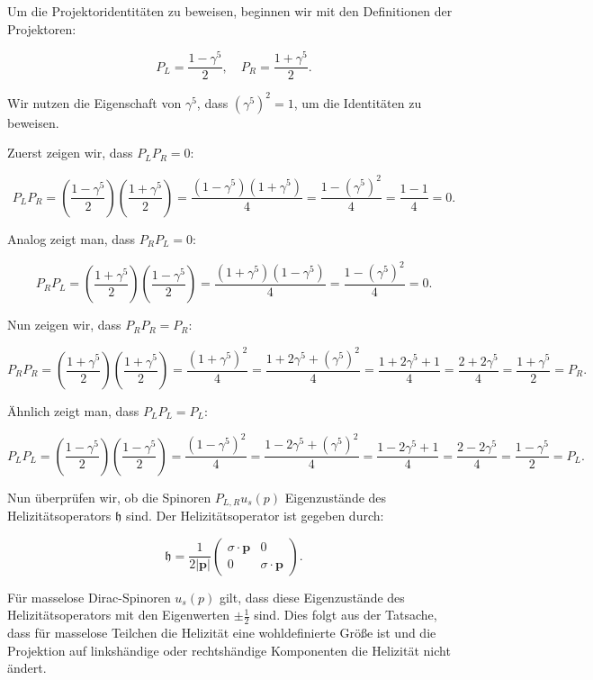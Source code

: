 Um die Projektoridentitäten zu beweisen, beginnen wir mit den Definitionen der Projektoren:

\[
P_L = \frac{1 - \gamma^5}{2}, \quad P_R = \frac{1 + \gamma^5}{2}.
\]

Wir nutzen die Eigenschaft von \(\gamma^5\), dass \((\gamma^5)^2 = 1\), um die Identitäten zu beweisen.

Zuerst zeigen wir, dass \(P_L P_R = 0\):

\[
P_L P_R = \left(\frac{1 - \gamma^5}{2}\right)\left(\frac{1 + \gamma^5}{2}\right) = \frac{(1 - \gamma^5)(1 + \gamma^5)}{4} = \frac{1 - (\gamma^5)^2}{4} = \frac{1 - 1}{4} = 0.
\]

Analog zeigt man, dass \(P_R P_L = 0\):

\[
P_R P_L = \left(\frac{1 + \gamma^5}{2}\right)\left(\frac{1 - \gamma^5}{2}\right) = \frac{(1 + \gamma^5)(1 - \gamma^5)}{4} = \frac{1 - (\gamma^5)^2}{4} = 0.
\]

Nun zeigen wir, dass \(P_R P_R = P_R\):

\[
P_R P_R = \left(\frac{1 + \gamma^5}{2}\right)\left(\frac{1 + \gamma^5}{2}\right) = \frac{(1 + \gamma^5)^2}{4} = \frac{1 + 2\gamma^5 + (\gamma^5)^2}{4} = \frac{1 + 2\gamma^5 + 1}{4} = \frac{2 + 2\gamma^5}{4} = \frac{1 + \gamma^5}{2} = P_R.
\]

Ähnlich zeigt man, dass \(P_L P_L = P_L\):

\[
P_L P_L = \left(\frac{1 - \gamma^5}{2}\right)\left(\frac{1 - \gamma^5}{2}\right) = \frac{(1 - \gamma^5)^2}{4} = \frac{1 - 2\gamma^5 + (\gamma^5)^2}{4} = \frac{1 - 2\gamma^5 + 1}{4} = \frac{2 - 2\gamma^5}{4} = \frac{1 - \gamma^5}{2} = P_L.
\]

Nun überprüfen wir, ob die Spinoren \(P_{L, R} u_s(p)\) Eigenzustände des Helizitätsoperators \(\mathfrak{h}\) sind. Der Helizitätsoperator ist gegeben durch:

\[
\mathfrak{h} = \frac{1}{2|\mathbf{p}|}\left(\begin{array}{cc}
\sigma \cdot \mathbf{p} & 0 \\
0 & \sigma \cdot \mathbf{p}
\end{array}\right).
\]

Für masselose Dirac-Spinoren \(u_s(p)\) gilt, dass diese Eigenzustände des Helizitätsoperators mit den Eigenwerten \(\pm \frac{1}{2}\) sind. Dies folgt aus der Tatsache, dass für masselose Teilchen die Helizität eine wohldefinierte Größe ist und die Projektion auf linkshändige oder rechtshändige Komponenten die Helizität nicht ändert.

